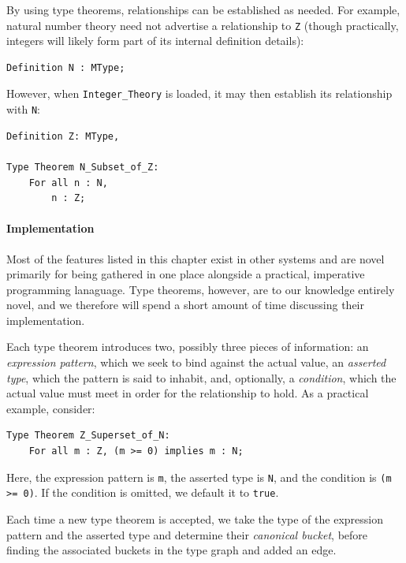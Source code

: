 By using type theorems, relationships can be established as needed.  For example, natural number theory need not advertise a relationship to \texttt{Z} (though practically, integers will likely form part of its internal definition details):

\begin{lstlisting}
Definition N : MType;
\end{lstlisting}

However, when \texttt{Integer\_Theory} is loaded, it may then establish its relationship with \texttt{N}:

\begin{lstlisting}
Definition Z: MType,

Type Theorem N_Subset_of_Z:
	For all n : N,
		n : Z;
\end{lstlisting}

\paragraph{Implementation\label{typeTheoremImplementation}}

Most of the features listed in this chapter exist in other systems and are novel primarily for being gathered in one place alongside a practical, imperative programming lanaguage.  Type theorems, however, are to our knowledge entirely novel, and we therefore will spend a short amount of time discussing their implementation.

Each type theorem introduces two, possibly three pieces of information: an \emph{expression pattern}, which we seek to bind against the actual value, an \emph{asserted type}, which the pattern is said to inhabit, and, optionally, a \emph{condition}, which the actual value must meet in order for the relationship to hold.  As a practical example, consider:

\begin{lstlisting}
Type Theorem Z_Superset_of_N:
	For all m : Z, (m >= 0) implies m : N;
\end{lstlisting}

Here, the expression pattern is \texttt{m}, the asserted type is \texttt{N}, and the condition is \texttt{(m >= 0)}.  If the condition is omitted, we default it to \texttt{true}.

Each time a new type theorem is accepted, we take the type of the expression pattern and the asserted type and determine their \emph{canonical bucket}, before finding the associated buckets in the type graph and added an edge.

